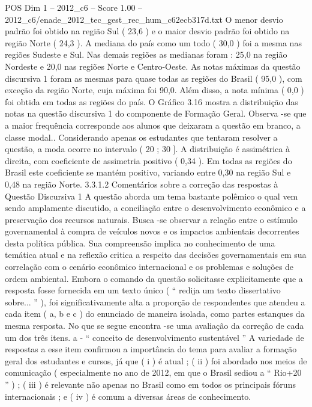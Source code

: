 \begin{textsample}{POS Dim 1 – 2012\_c6 – Score 1.00 – 2012\_c6/enade\_2012\_tec\_gest\_rec\_hum\_c62ecb317d.txt}
O menor desvio padrão foi obtido na região Sul ( 23,6 ) e o maior desvio padrão foi obtido na região Norte ( 24,3 ).
A mediana do país como um todo ( 30,0 ) foi a mesma nas regiões Sudeste e Sul.
Nas demais regiões as medianas foram : 25,0 na região Nordeste e 20,0 nas regiões Norte e Centro-Oeste.
As notas máximas da questão discursiva 1 foram as mesmas para quase todas as regiões do Brasil ( 95,0 ), com exceção da região Norte, cuja máxima foi 90,0.
Além disso, a nota mínima ( 0,0 ) foi obtida em todas as regiões do país.
O Gráfico 3.16 mostra a distribuição das notas na questão discursiva 1 do componente de Formação Geral.
Observa -se que a maior frequência corresponde aos alunos que deixaram a questão em branco, a classe modal..
Considerando apenas os estudantes que tentaram resolver a questão, a moda ocorre no intervalo ( 20 ; 30 ].
A distribuição é assimétrica à direita, com coeficiente de assimetria positivo ( 0,34 ).
Em todas as regiões do Brasil este coeficiente se mantém positivo, variando entre 0,30 na região Sul e 0,48 na região Norte. 3.3.1.2 Comentários sobre a correção das respostas à Questão Discursiva 1 A questão aborda um tema bastante polêmico o qual vem sendo amplamente discutido, a conciliação entre o desenvolvimento econômico e a preservação dos recursos naturais.
Busca -se observar a relação entre o estímulo governamental à compra de veículos novos e os impactos ambientais decorrentes desta política pública.
Sua compreensão implica no conhecimento de uma temática atual e na reflexão critica a respeito das decisões governamentais em sua correlação com o cenário econômico internacional e os problemas e soluções de ordem ambiental.
Embora o comando da questão solicitasse explicitamente que a resposta fosse fornecida em um texto único ( “ redija um texto dissertativo sobre... ” ), foi significativamente alta a proporção de respondentes que atendeu a cada item ( a, b e c ) do enunciado de maneira isolada, como partes estanques da mesma resposta.
No que se segue encontra -se uma avaliação da correção de cada um dos três itens. a - “ conceito de desenvolvimento sustentável ” A variedade de respostas a esse item confirmou a importância do tema para avaliar a formação geral dos estudantes e cursos, já que ( i ) é atual ; ( ii ) foi abordado nos meios de comunicação ( especialmente no ano de 2012, em que o Brasil sediou a “ Rio+20 ” ) ; ( iii ) é relevante não apenas no Brasil como em todos os principais fóruns internacionais ; e ( iv ) é comum a diversas áreas de conhecimento.

\end{textsample}
